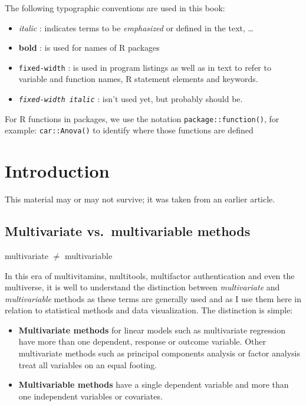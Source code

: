 \documentclass[
  letterpaper,
  10pt,
  krantz2]{krantz}
\renewenvironment{quote}{\begin{VF}}{\end{VF}}
\begin{document}

The following typographic conventions are used in this book:

\begin{itemize}
\item
  \emph{italic} : indicates terms to be \emph{emphasized} or defined in
  the text, \ldots{}
\item
  \textbf{bold} : is used for names of R packages
\item
  \texttt{fixed-width} : is used in program listings as well as in text
  to refer to variable and function names, R statement elements and
  keywords.
\item
  \emph{\texttt{fixed-width\ italic}} : isn't used yet, but probably
  should be.
\end{itemize}

For R functions in packages, we use the notation
\texttt{package::function()}, for example: \texttt{car::Anova()} to
identify where those functions are defined

\mainmatter


\hypertarget{sec-introduction}{%
\chapter{Introduction}\label{sec-introduction}}

This material may or may not survive; it was taken from an earlier
article.

\hypertarget{multivariate-vs.-multivariable-methods}{%
\section{Multivariate vs.~multivariable
methods}\label{multivariate-vs.-multivariable-methods}}

\begin{quote}
multivariate \(\ne\) multivariable
\end{quote}

In this era of multivitamins, multitools, multifactor authentication and
even the multiverse, it is well to understand the distinction between
\emph{multivariate} and \emph{multivariable} methods as these terms are
generally used and as I use them here in relation to statistical methods
and data visualization. The distinction is simple:

\begin{itemize}
\item
  \textbf{Multivariate methods} for linear models such as multivariate
  regression have more than one dependent, response or outcome variable.
  Other multivariate methods such as principal components analysis or
  factor analysis treat all variables on an equal footing.
\item
  \textbf{Multivariable methods} have a single dependent variable and
  more than one independent variables or covariates.
\end{itemize}
\end{document}
